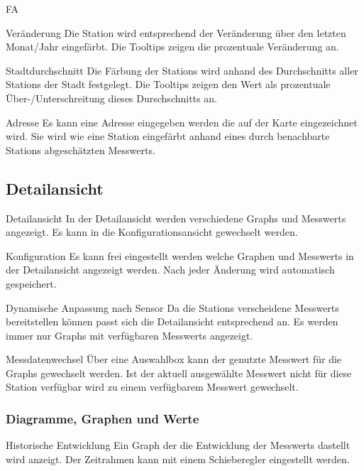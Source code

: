 \begin{Kriterien}{FA}
 \item[Veränderung]
   Die \gls{Station} wird entsprechend der Veränderung über den letzten Monat/Jahr eingefärbt.
   Die \glspl{Tooltip} zeigen die prozentuale Veränderung an.

 \item[Stadtdurchschnitt]
  Die Färbung der \glspl{Station} wird anhand des Durchschnitts aller \glspl{Station} der Stadt festgelegt.
  Die \glspl{Tooltip} zeigen den Wert als prozentuale Über-/Unterschreitung dieses Durschschnitts an. 

 \item[Adresse]
   Es kann eine Adresse eingegeben werden die auf der Karte eingezeichnet wird.
   Sie wird wie eine \gls{Station} eingefärbt anhand eines durch benachbarte \glspl{Station} abgeschätzten \glspl{Messwert}.

\subsection{Detailansicht}

 \item[Detailansicht]
   In der Detailansicht werden verschiedene \glspl{Graph} und \glspl{Messwert} angezeigt.
   Es kann in die Konfigurationsansicht gewechselt werden.

 \item[Konfiguration]
   Es kann frei eingestellt werden welche Graphen und \glspl{Messwert} in der Detailansicht angezeigt werden.
   Nach jeder Änderung wird automatisch gespeichert. 

 \item[Dynamische Anpassung nach Sensor]
   Da die \glspl{Station} verscheidene \glspl{Messwert} bereitstellen können passt sich die Detailansicht entsprechend an.
   Es werden immer nur \glspl{Graph} mit verfügbaren \glspl{Messwert} angezeigt.

 \item[Messdatenwechsel]
  Über eine Auswahlbox kann der genutzte \gls{Messwert} für die \glspl{Graph} gewechselt werden.
  Ist der aktuell ausgewählte \gls{Messwert} nicht für diese \gls{Station} verfügbar wird zu einem verfügbarem \gls{Messwert} gewechselt.

 \subsubsection{Diagramme, Graphen und Werte}

 \item[Historische Entwicklung]
   Ein Graph der die Entwicklung der \glspl{Messwert} dastellt wird anzeigt.
   Der Zeitrahmen kann mit einem Schieberegler eingestellt werden.
 

\end{Kriterien}
